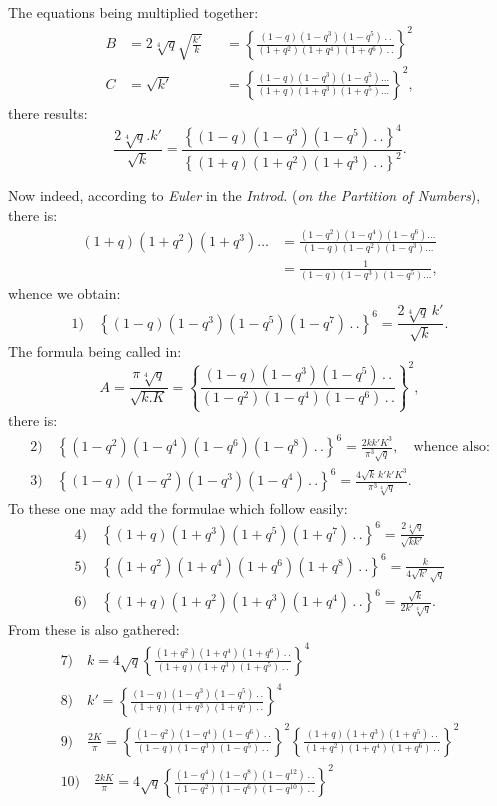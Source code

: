 \documentclass{article}
\begin{document}
The equations being multiplied together:
\[
\begin{aligned}
B&=2\sqrt[4]{q}\sqrt{\frac{k'}{k}}&&=\left\{\frac{(1-q)(1-q^{3})(1-q^{5})\,.\,.}{(1+q^{2})(1+q^{4})(1+q^{6})\,.\,.}\right\}^{2}\\[2ex]
C&=\sqrt{k'}&&=\left\{\frac{(1-q)(1-q^{3})(1-q^{5})\ldots}{(1+q)(1+q^{3})(1+q^{5})\ldots}\right\}^{2},
\end{aligned}
\]
there results:
\[
\frac{2\sqrt[4]{q}.k'}{\sqrt{k}}=\frac{\left\{(1-q)(1-q^{3})(1-q^{5})\,.\,.\right\}^{4}}{\left\{(1+q)(1+q^{2})(1+q^{3})\,.\,.\right\}^{2}}.
\]

Now indeed, according to \emph{Euler} in the \emph{Introd.} (\emph{on the Partition of Numbers}), there is:
\[
\begin{aligned}
(1+q)(1+q^{2})(1+q^{3})\ldots&=\frac{(1-q^{2})(1-q^{4})(1-q^{6})\ldots}{(1-q)(1-q^{2})(1-q^{3})\ldots}\\[2ex]
&=\frac{1}{(1-q)(1-q^{3})(1-q^{5})\ldots},
\end{aligned}
\]
whence we obtain:
\[
\text{1)}\quad\left\{(1-q)(1-q^{3})(1-q^{5})(1-q^{7})\,.\,.\right\}^{6}=\frac{2\sqrt[4]{q}\,k'}{\sqrt{k}}.
\]
The formula being called in:
\[
A=\frac{\pi\sqrt[4]{q}}{\sqrt{k.K}}=\left\{\frac{(1-q)(1-q^{3})(1-q^{5})\,.\,.}{(1-q^{2})(1-q^{4})(1-q^{6})\,.\,.}\right\}^{2},
\]
there is:
\[
\begin{gathered}
\text{2)}\quad\left\{(1-q^{2})(1-q^{4})(1-q^{6})(1-q^{8})\,.\,.\right\}^{6}=\frac{2kk'K^{3}}{\pi^{3}\sqrt{q}},\quad\text{whence also:}
\\[2ex]
\text{3)}\quad\left\{(1-q)(1-q^{2})(1-q^{3})(1-q^{4})\,.\,.\right\}^{6}=\frac{4\sqrt{k}\,k'k'K^{3}}{\pi^{3}\sqrt[4]{q}}.
\end{gathered}
\]
To these one may add the formulae which follow easily:
\[
\begin{gathered}
\text{4)}\quad\left\{(1+q)(1+q^{3})(1+q^{5})(1+q^{7})\,.\,.\right\}^{6}=\frac{2\sqrt[4]{q}}{\sqrt{kk'}}
\\[2ex]
\text{5)}\quad\left\{(1+q^{2})(1+q^{4})(1+q^{6})(1+q^{8})\,.\,.\right\}^{6}=\frac{k}{4\sqrt{k'}\sqrt{q}}
\\[2ex]
\text{6)}\quad\left\{(1+q)(1+q^{2})(1+q^{3})(1+q^{4})\,.\,.\right\}^{6}=\frac{\sqrt{k}}{2k'\sqrt[4]{q}}.
\end{gathered}
\]
From these is also gathered:
\[
\begin{gathered}
\text{7)}\quad k=4\sqrt{q}\left\{\frac{(1+q^{2})(1+q^{4})(1+q^{6})\,.\,.}{(1+q)(1+q^{3})(1+q^{5})\,.\,.}\right\}^{4}
\\[2ex]
\text{8)}\quad k'=\left\{\frac{(1-q)(1-q^{3})(1-q^{5})\,.\,.}{(1+q)(1+q^{3})(1+q^{5})\,.\,.}\right\}^{4}
\\[2ex]
\text{9)}\quad\frac{2K}{\pi}=\left\{\frac{(1-q^{2})(1-q^{4})(1-q^{6})\,.\,.}{(1-q)(1-q^{3})(1-q^{5})\,.\,.}\right\}^{2}\left\{\frac{(1+q)(1+q^{3})(1+q^{5})\,.\,.}{(1+q^{2})(1+q^{4})(1+q^{6})\,.\,.}\right\}^{2}
\\[2ex]
\text{10)}\quad\frac{2kK}{\pi}=4\sqrt{q}\left\{\frac{(1-q^{4})(1-q^{8})(1-q^{12})\,.\,.}{(1-q^{2})(1-q^{6})(1-q^{10})\,.\,.}\right\}^{2}
\end{gathered}
\]
\end{document}
